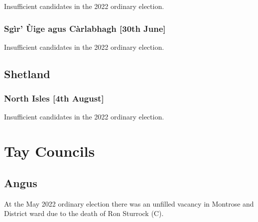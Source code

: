 \documentclass[a4paper,openany]{book}
\begin{document}
\begin{resultsiii}

Insufficient candidates in the 2022 ordinary election.

\subsubsection*{Sgìr’ Ùige agus Càrlabhagh \hspace*{\fill}\nolinebreak[1]%
	\enspace\hspace*{\fill}
	[30th June]}


Insufficient candidates in the 2022 ordinary election.

\subsection*{Shetland}

\subsubsection*{North Isles \hspace*{\fill}\nolinebreak[1]%
	\enspace\hspace*{\fill}
	[4th August]}


Insufficient candidates in the 2022 ordinary election.

\section{Tay Councils}

\subsection*{Angus}

At the May 2022 ordinary election there was an unfilled vacancy in Montrose and District ward due to the death of Ron Sturrock (C).%

\end{resultsiii}

\clearpage
{}
{\scriptsize%
\frenchspacing\printindex}
\thispagestyle{plain}
\end{document}
